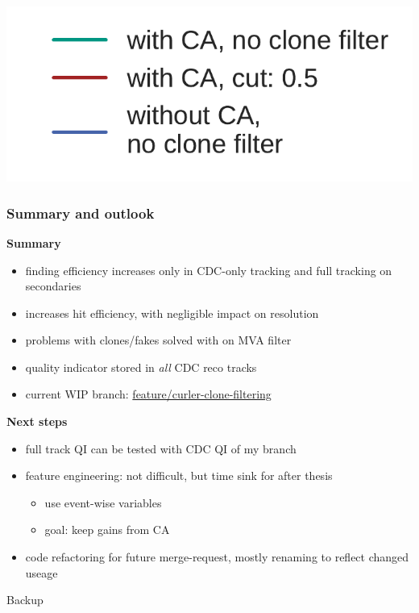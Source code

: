 \documentclass[18pt, aspectratio=169]{beamer}
\begin{document}
\begin{frame}
\begin{columns}
\begin{column}{.5\textwidth}
    \end{column}
  \end{columns}
  \begin{center}
    \includegraphics[width=.2\textwidth]{figures/legend_fom_profile.pdf}
  \end{center}
\end{frame}

\begin{frame}
  \frametitle{Summary and outlook}
  \textbf{Summary}
  \begin{itemize}
  \item finding efficiency increases only in CDC-only tracking and full tracking on secondaries
  \item increases hit efficiency, with negligible impact on resolution
  \item problems with clones/fakes solved with on MVA filter
  \item quality indicator stored in \emph{all} CDC reco tracks
  \item current WIP branch: \href{https://stash.desy.de/projects/B2/repos/software/browse?at=refs\%2Fheads\%2Ffeature\%2Fcurler-clone-filtering}{feature/curler-clone-filtering}
  \end{itemize}
  \textbf{Next steps}
  \begin{itemize}
  \item full track QI can be tested with CDC QI of my branch
  \item feature engineering: not difficult, but time sink for after thesis
    \begin{itemize}
    \item use event-wise variables
    \item goal: keep gains from CA
    \end{itemize}
  \item code refactoring for future merge-request, mostly renaming to reflect changed useage
  \end{itemize}
\end{frame}

\appendix
\backupbegin
\begin{frame}
  \centering \huge
  Backup
\end{frame}
\end{document}
